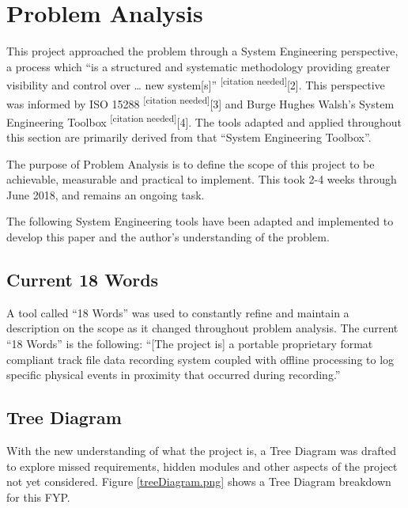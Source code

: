 \documentclass{UoNMCHA}
\newcommand{\citationneeded}{\textsuperscript{\color{blue} [citation needed]}}
\newcommand{\inlineQuote}[1]{``#1''}
\newcommand{\fref}[1] {Figure \ref{#1}}
\numberwithin{equation}{section}
\begin{document}
\section{Problem Analysis}\label{sec:ProblemAnalysis}

This project approached the problem through a System Engineering perspective, a process which “is a structured and systematic methodology providing greater visibility and control over … new system[s]” \citationneeded [2]. This perspective was informed by ISO 15288 \citationneeded [3] and Burge Hughes Walsh’s System Engineering Toolbox \citationneeded [4]. The tools adapted and applied throughout this section are primarily derived from that \inlineQuote{System Engineering Toolbox}. 

The purpose of Problem Analysis is to define the scope of this project to be achievable, measurable and practical to implement. This took 2-4 weeks through June 2018, and remains an ongoing task. 

The following System Engineering tools have been adapted and implemented to develop this paper and the author’s understanding of the problem. 

\subsection{Current 18 Words}
A tool called \inlineQuote{18 Words} was used to constantly refine and maintain a description on the scope as it changed throughout problem analysis. The current “18 Words” is the following:
“[The project is] a portable proprietary format compliant track file data recording system coupled with offline processing to log specific physical events in proximity that occurred during recording.” 

\subsection{Tree Diagram}
With the new understanding of what the project is, a Tree Diagram was drafted to explore missed requirements, hidden modules and other aspects of the project not yet considered. \fref{treeDiagram.png} shows a Tree Diagram breakdown for this FYP.
\end{document}
